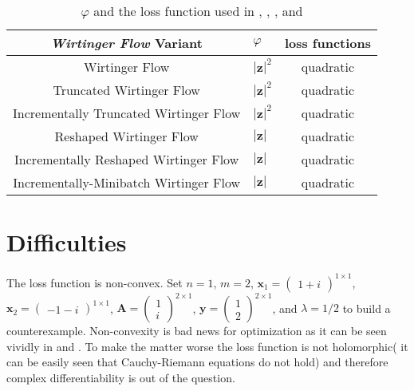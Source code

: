 \begin{table}
	\centering
	\begin{tabular}{||c l c||} 
	 \hline
	 \emph{Wirtinger Flow} Variant 			 & $\varphi$ 						& loss functions\\ [0.5ex] 
	 \hline\hline
	 Wirtinger Flow 			 			 & $\left|\boldsymbol{z}\right|^2$ 	& quadratic 	\\ 
	 Truncated Wirtinger Flow   			 & $\left|\boldsymbol{z}\right|^2$ 	& quadratic 	\\
	 Incrementally Truncated Wirtinger Flow  & $\left|\boldsymbol{z}\right|^2$  & quadratic 	\\
	 Reshaped Wirtinger Flow 				 & $\left|\boldsymbol{z}\right|$ 	& quadratic 	\\
	 Incrementally Reshaped Wirtinger Flow 	 & $\left|\boldsymbol{z}\right|$ 	& quadratic 	\\
	 Incrementally-Minibatch Wirtinger Flow  & $\left|\boldsymbol{z}\right|$ 	& quadratic 	\\ [1ex] 
	 \hline
	\end{tabular}
	\caption{$\varphi$ and the loss function used in \cite{Candes2014}, \cite{Chen2015}, \cite{Kolte2016}, and \cite{Zhang2016}}
	\label{tab:formulation}
	\end{table}
\section{Difficulties}

The loss function is non-convex. Set $n=1$, $m=2$, $\boldsymbol{x}_1 = \begin{pmatrix}1+i\end{pmatrix}^{1 \times 1}$, 
$\boldsymbol{x}_2 = \begin{pmatrix}-1-i\end{pmatrix}^{1 \times 1}$, $\boldsymbol{A}=\begin{pmatrix}1\\i \end{pmatrix}^{2 \times 1}$, 
$\boldsymbol{y}=\begin{pmatrix}1\\2 \end{pmatrix}^{2 \times 1}$, and $\lambda=1/2$ to build a counterexample. Non-convexity is bad news for 
optimization as it can be seen vividly in \cite{Boyd2004} and \cite{Nocedal2006}. To make the matter worse the loss function is not 
holomorphic( it can be easily seen that Cauchy-Riemann equations\cite{Rudin1987} do not hold) and therefore complex differentiability 
is out of the question\cite{Rudin1987}.

